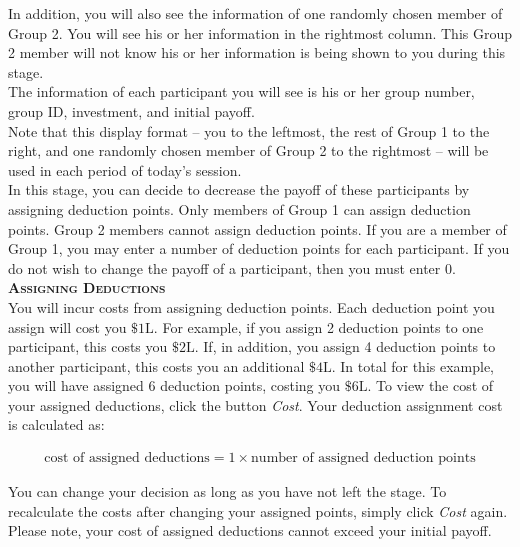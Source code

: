 \documentclass[12pt]{article}
\begin{document}
In addition, you will also see the information of one randomly chosen member of Group 2. You will see his or her information in the rightmost column. This Group 2 member will not know his or her information is being shown to you during this stage.\\

The information of each participant you will see is his or her group number, group ID, investment, and initial payoff.\\ 

Note that this display format -- you to the leftmost, the rest of Group 1 to the right, and one randomly chosen member of Group 2 to the rightmost -- will be used in each period of today's session.\\

In this stage, you can decide to decrease the payoff of these participants by assigning deduction points. Only members of Group 1 can assign deduction points.  Group 2 members cannot assign deduction points. 
If you are a member of Group 1, you may enter a number of deduction points for each participant. If you do not wish to change the payoff of a participant, then you must enter 0.\\ 

{\bf \scshape Assigning Deductions}\\

You will incur costs from assigning deduction points. Each deduction point you assign will cost you $\$1\text{L}$. For example, if you assign 2 deduction points to one participant, this costs you $\$2\text{L}$. If, in addition, you assign 4 deduction points to another participant, this costs you an additional $\$4\text{L}$. In total for this example, you will have assigned 6 deduction points, costing you $\$6\text{L}$.  To view the cost of your assigned deductions, click the button {\em Cost}. Your deduction assignment cost is calculated as: 

\begin{align*}
\text{cost of assigned deductions} = 1 \times \text{number of assigned deduction points}
\end{align*}

You can change your decision as long as you have not left the stage. To recalculate the costs after changing your assigned points, simply click {\em Cost} again.\\

Please note, your cost of assigned deductions cannot exceed your initial payoff.\\
\end{document}
